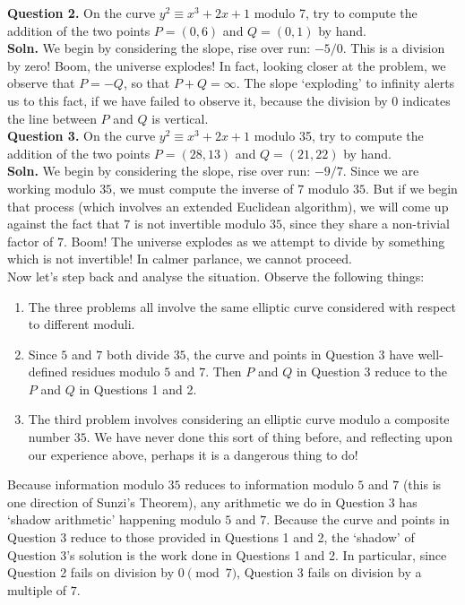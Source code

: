\documentclass{article}
\theoremstyle{plain}
\theoremstyle{definition}
\theoremstyle{remark}
\numberwithin{theorem}{section}
\begin{document}
\textbf{Question 2.}
On the curve $y^2 \equiv x^3 +2x + 1$ modulo 7, try to compute the addition of the two points $P = (0,6)$ and $Q = (0,1)$ by hand.\\

\textbf{Soln.} We begin by considering the slope, rise over run:  $-5/0$.  This is a division by zero!  Boom, the universe explodes!  In fact, looking closer at the problem, we observe that $P = -Q$, so that $P+Q = \infty$.  The slope `exploding' to infinity alerts us to this fact, if we have failed to observe it, because the division by $0$ indicates the line between $P$ and $Q$ is vertical.\\

\textbf{Question 3.}  On the curve $y^2 \equiv x^3 +2x + 1$ modulo 35, try to compute the addition of the two points $P = (28,13)$ and $Q = (21,22)$ by hand.\\

\textbf{Soln.} We begin by considering the slope, rise over run:  $-9/7$.  Since we are working modulo $35$, we must compute the inverse of $7$ modulo $35$.  But if we begin that process (which involves an extended Euclidean algorithm), we will come up against the fact that $7$ is not invertible modulo $35$, since they share a non-trivial factor of $7$.  Boom!  The universe explodes as we attempt to divide by something which is not invertible!  In calmer parlance, we cannot proceed.\\

Now let's step back and analyse the situation.  Observe the following things:
\begin{enumerate}
    \item The three problems all involve the same elliptic curve considered with respect to different moduli.
    \item Since $5$ and $7$ both divide $35$, the curve and points in Question 3 have well-defined residues modulo $5$ and $7$.  Then $P$ and $Q$ in Question $3$ reduce to the $P$ and $Q$ in Questions 1 and 2.  
        \item The third problem involves considering an elliptic curve modulo a composite number $35$.  We have never done this sort of thing before, and reflecting upon our experience above, perhaps it is a dangerous thing to do!
\end{enumerate}

Because information modulo $35$ reduces to information modulo $5$ and $7$ (this is one direction of Sunzi's Theorem), any arithmetic we do in Question 3 has `shadow arithmetic' happening modulo $5$ and $7$.  Because the curve and points in Question 3 reduce to those provided in Questions 1 and 2, the `shadow' of Question 3's solution is the work done in Questions 1 and 2.  In particular, since Question 2 fails on division by $0 \pmod{7}$, Question 3 fails on division by a multiple of $7$.
\end{document}
